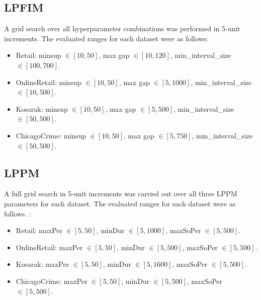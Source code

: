 \subsection{LPFIM}
A grid search over all hyperparameter combinations was performed in 5‐unit increments. The evaluated ranges for each dataset were as follows:
\begin{itemize}
  \item Retail: minsup $\in[10,50]$, max gap $\in[10,120]$, min\_interval\_size $\in[100,700]$.
  \item OnlineRetail: minsup $\in[10,50]$, max gap $\in[5,1000]$, min\_interval\_size $\in[10,500]$.
  \item Kosarak: minsup $\in[10,50]$, max gap $\in[5,500]$, min\_interval\_size $\in[50,500]$.
  \item ChicagoCrime: minsup $\in[10,50]$, max gap $\in[5,750]$, min\_interval\_size $\in[50,500]$.
\end{itemize}

\subsection{LPPM}
A full grid search in 5‐unit increments was carried out over all three LPPM parameters for each dataset. The evaluated ranges for each dataset were as follows.  :
\begin{itemize}
  \item Retail: maxPer $\in[5,50]$, minDur $\in[5,1000]$, maxSoPer $\in[5,500]$.
  \item OnlineRetail: maxPer $\in[5,50]$, minDur $\in[5,500]$, maxSoPer $\in[5,500]$.
  \item Kosarak: maxPer $\in[5,50]$, minDur $\in[5,1600]$, maxSoPer $\in[5,500]$.
  \item ChicagoCrime: maxPer $\in[5,50]$, minDur $\in[5,500]$, maxSoPer $\in[5,500]$.
\end{itemize}

